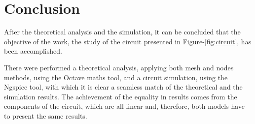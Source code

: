 \section{Conclusion}
\label{sec:conclusion}

After the theoretical analysis and the simulation, it can be concluded that the
objective of the work, the study of the circuit presented in Figure-\ref{fig:circuit},
has been accomplished. \par
There were performed a theoretical analysis, applying both mesh and nodes methods,
using the Octave maths tool, and a circuit simulation, using the Ngspice tool,
with which it is clear a seamless match of the theoretical and the simulation results.
The achievement of the equality in results comes from the components of the circuit,
which are all linear and, therefore, both models have to present the same results.
